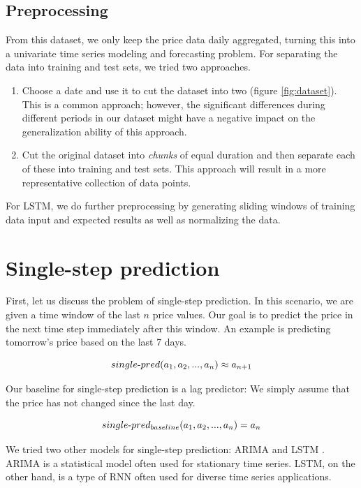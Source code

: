 \documentclass[final]{beamer}
\begin{document}
\begin{frame}[t]
\begin{multicols}{3}
\subsection{Preprocessing}
From this dataset, we only keep the price data daily aggregated, turning this into a univariate time series modeling and forecasting problem. For separating the data into training and test sets, we tried two approaches.

\begin{enumerate}
    \item Choose a date and use it to cut the dataset into two (figure \ref{fig:dataset}). This is a common approach; however, the significant differences during different periods in our dataset might have a negative impact on the generalization ability of this approach.
    \item Cut the original dataset into \emph{chunks} of equal duration and then separate each of these into training and test sets. This approach will result in a more representative collection of data points. 
\end{enumerate}

For LSTM, we do further preprocessing by generating sliding windows of training data input and expected results as well as normalizing the data. 


\section{Single-step prediction}

First, let us discuss the problem of single-step prediction. In this scenario, we are given a time window of the last $n$ price values. Our goal is to predict the price in the next time step immediately after this window. An example is predicting tomorrow's price based on the last 7 days.

\vspace{-1.2em}
$$single\textnormal{-}pred(a_1, a_2, ..., a_n) \approx a_{n+1}$$

Our baseline for single-step prediction is a lag predictor: We simply assume that the price has not changed since the last day. 

\vspace{-1.2em}
$$single\textnormal{-}pred_{baseline}(a_1, a_2, ..., a_n) = a_n$$

We tried two other models for single-step prediction: ARIMA and LSTM \cite{ref3}. ARIMA is a statistical model often used for stationary time series. LSTM, on the other hand, is a type of RNN often used for diverse time series applications.


\end{multicols}
\end{frame}
\end{document}
